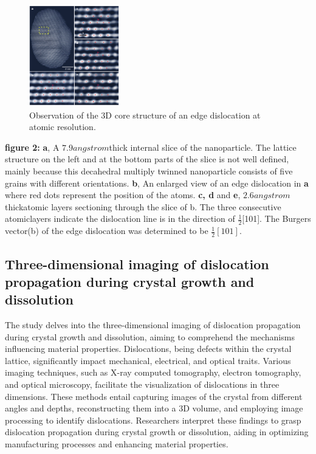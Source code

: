 \documentclass[12pt, a4paper, twocolumn]{article}
\begin{document}
\begin{figure}[h]
	\includegraphics[width=0.35\textwidth]{3d_di2.png}
	\caption{Observation of the 3D core structure of an edge dislocation at	atomic resolution.
}
\end{figure}
\textbf{figure 2:} \textbf{a}, A $7.9 angstrom $thick internal slice of the nanoparticle. The lattice structure on the left and at the bottom parts of the slice is not well defined,
mainly because this decahedral multiply twinned nanoparticle consists of five
grains with different orientations. \textbf{b}, An enlarged view of an edge dislocation in \textbf{a} where red dots represent the position of the atoms. \textbf{c, d} and \textbf{e}, $2.6 angstrom$thickatomic layers sectioning through the slice of b. The three consecutive atomiclayers indicate the dislocation line is in the direction of $\frac{1}{2}$[101]. The Burgers vector(b) of the edge dislocation was determined to be $\frac{1}{2}[101]$.

\subsection{Three-dimensional imaging of dislocation propagation during crystal growth and dissolution}
The study delves into the three-dimensional imaging of dislocation propagation during crystal growth and dissolution, aiming to comprehend the mechanisms influencing material properties. Dislocations, being defects within the crystal lattice, significantly impact mechanical, electrical, and optical traits. Various imaging techniques, such as X-ray computed tomography, electron tomography, and optical microscopy, facilitate the visualization of dislocations in three dimensions. These methods entail capturing images of the crystal from different angles and depths, reconstructing them into a 3D volume, and employing image processing to identify dislocations. Researchers interpret these findings to grasp dislocation propagation during crystal growth or dissolution, aiding in optimizing manufacturing processes and enhancing material properties.\par
\end{document}
